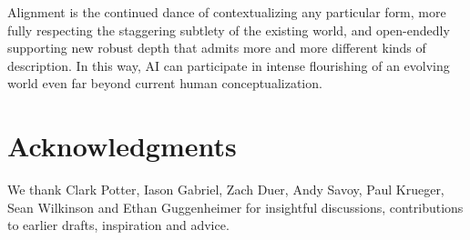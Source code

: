 \documentclass[11pt]{article}
\newcommand{\new}[1]{\textcolor{teal}{#1}}
\begin{document}
Alignment is the continued dance of contextualizing any particular form, more fully respecting the staggering subtlety of the existing world, and open-endedly supporting new robust depth that admits more and more different kinds of description. In this way, AI can participate in intense flourishing of an evolving world even far beyond current human conceptualization. 



\section*{Acknowledgments}

We thank Clark Potter, Iason Gabriel, Zach Duer, Andy Savoy, Paul Krueger, Sean Wilkinson and Ethan Guggenheimer for insightful discussions, contributions to earlier drafts, inspiration and advice.




\end{document}
